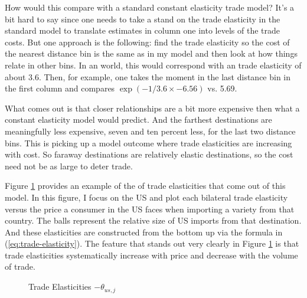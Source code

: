 \documentclass[12pt,pdftex]{article}
\begin{document}
\begin{onehalfspacing}
How would this compare with a standard constant elasticity trade model? It's a bit hard to say since one needs to take a stand on the trade elasticity in the standard model to translate estimates in column one into levels of the trade costs. But one approach is the following: find the trade elasticity so the cost of the nearest distance bin is the same as in my model and then look at how things relate in other bins. In an \citet{eaton2002technology} world, this would correspond with an trade elasticity of about 3.6. Then, for example, one takes the moment in the last distance bin in the first column and compares $\exp( - 1 / 3.6 \times  -6.56)$ vs. 5.69.

What comes out is that closer relationships are a bit more expensive then what a constant elasticity model would predict. And the farthest destinations are meaningfully less expensive, seven and ten percent less, for the last two distance bins. This is picking up a model outcome where trade elasticities are increasing with cost. So faraway destinations are relatively elastic destinations, so the cost need not be as large to deter trade.

Figure \ref{fig:bilateral-elasticities} provides an example of the of trade elasticities that come out of this model. In this figure, I focus on the US and plot each bilateral trade elasticity versus the price a consumer in the US faces when importing a variety from that country. The balls represent the relative size of US imports from that destination. And these elasticities are constructed from the bottom up via the formula in (\ref{eq:trade-elasticity}). The feature that stands out very clearly in Figure \ref{fig:bilateral-elasticities} is that trade elasticities systematically increase with price and decrease with the volume of trade.

\begin{figure}[!t]
\caption{Trade Elasticities $-\theta_{us,j}$}\label{fig:bilateral-elasticities}
\end{figure}


\end{onehalfspacing}
\end{document}

